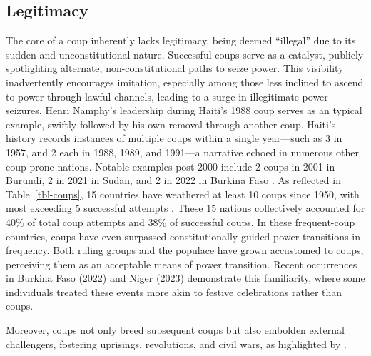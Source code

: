 \documentclass[
  12pt,
  a4paper,
  12pt]{article}
\begin{document}
\subsection{Legitimacy}\label{legitimacy}

The core of a coup inherently lacks legitimacy, being deemed ``illegal''
due to its sudden and unconstitutional nature. Successful coups serve as
a catalyst, publicly spotlighting alternate, non-constitutional paths to
seize power. This visibility inadvertently encourages imitation,
especially among those less inclined to ascend to power through lawful
channels, leading to a surge in illegitimate power seizures. Henri
Namphy's leadership during Haiti's 1988 coup serves as an typical
example, swiftly followed by his own removal through another coup.
Haiti's history records instances of multiple coups within a single
year---such as 3 in 1957, and 2 each in 1988, 1989, and 1991---a
narrative echoed in numerous other coup-prone nations. Notable examples
post-2000 include 2 coups in 2001 in Burundi, 2 in 2021 in Sudan, and 2
in 2022 in Burkina Faso \citep{powell2011}. As reflected in
Table~\ref{tbl-coups}, 15 countries have weathered at least 10 coups
since 1950, with most exceeding 5 successful attempts
\citep{powell2011}. These 15 nations collectively accounted for 40\% of
total coup attempts and 38\% of successful coups. In these frequent-coup
countries, coups have even surpassed constitutionally guided power
transitions in frequency. Both ruling groups and the populace have grown
accustomed to coups, perceiving them as an acceptable means of power
transition. Recent occurrences in Burkina Faso (2022) and Niger (2023)
demonstrate this familiarity, where some individuals treated these
events more akin to festive celebrations rather than coups.

Moreover, coups not only breed subsequent coups but also embolden
external challengers, fostering uprisings, revolutions, and civil wars,
as highlighted by \citet{dahl2023}.
\end{document}
